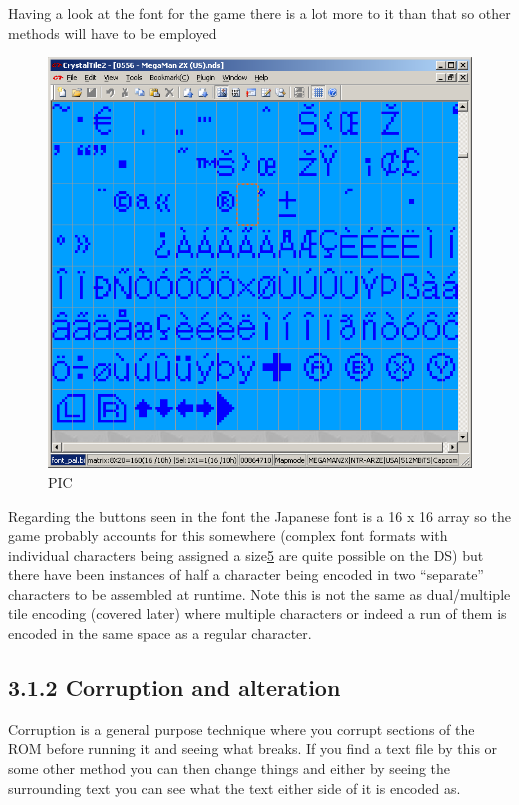 \documentclass[
]{book}
\begin{document}
Having a look at the font for the game there is a lot more to it than that so other methods will have to be employed

\begin{figure}
\centering
\includegraphics{images/88_home_fast6191_romhackingguide_unrenamed_file___rs_romhackingguiderelativesearchfontviewing.png}
\caption{PIC}
\end{figure}

Regarding the buttons seen in the font the Japanese font is a 16 x 16 array so the game probably accounts for this somewhere (complex font formats with individual characters being assigned a size\href{romhacking20206.html\#fn5x0}{5} are quite possible on the DS) but there have been instances of half a character being encoded in two ``separate'' characters to be assembled at runtime. Note this is not the same as dual/multiple tile encoding (covered later) where multiple characters or indeed a run of them is encoded in the same space as a regular character.

\hypertarget{corruption-and-alteration}{%
\subsection{3.1.2 Corruption and alteration}\label{corruption-and-alteration}}

Corruption is a general purpose technique where you corrupt sections of the ROM before running it and seeing what breaks. If you find a text file by this or some other method you can then change things and either by seeing the surrounding text you can see what the text either side of it is encoded as.
\end{document}
